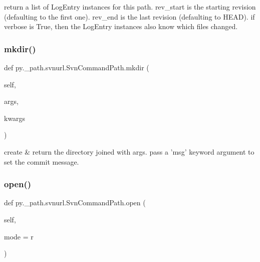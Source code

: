 \begin{DoxyVerb}return a list of LogEntry instances for this path.
rev_start is the starting revision (defaulting to the first one).
rev_end is the last revision (defaulting to HEAD).
if verbose is True, then the LogEntry instances also know which files changed.
\end{DoxyVerb}
 \mbox{\label{classpy_1_1__path_1_1svnurl_1_1_svn_command_path_a3d92713c05b9a68cd4ef4ffad5d56bd0}} 
\subsubsection{\texorpdfstring{mkdir()}{mkdir()}}
{\footnotesize\ttfamily def py.\+\_\+path.\+svnurl.\+Svn\+Command\+Path.\+mkdir (\begin{DoxyParamCaption}\item[{}]{self,  }\item[{}]{args,  }\item[{}]{kwargs }\end{DoxyParamCaption})}

\begin{DoxyVerb}create & return the directory joined with args.
pass a 'msg' keyword argument to set the commit message.
\end{DoxyVerb}
 \mbox{\label{classpy_1_1__path_1_1svnurl_1_1_svn_command_path_a66e970e14d18e617b26b7f95718233db}} 
\subsubsection{\texorpdfstring{open()}{open()}}
{\footnotesize\ttfamily def py.\+\_\+path.\+svnurl.\+Svn\+Command\+Path.\+open (\begin{DoxyParamCaption}\item[{}]{self,  }\item[{}]{mode = {\ttfamily \textquotesingle{}r\textquotesingle{}} }\end{DoxyParamCaption})}

